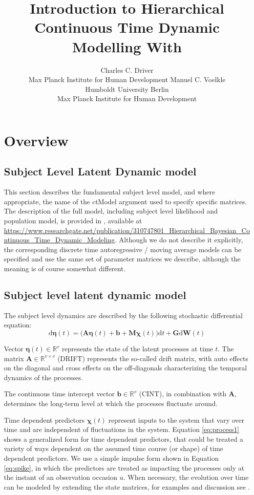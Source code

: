 \documentclass[nojss]{jss}\usepackage[]{graphicx}\usepackage[]{color}
\author{Charles C. Driver \\ Max Planck Institute for Human Development \And 
Manuel C. Voelkle \\ Humboldt University Berlin \\ Max Planck Institute for Human Development}
\title{Introduction to Hierarchical Continuous Time Dynamic Modelling With \pkg{ctsem}}
\newcommand{\vect}[1]{\boldsymbol{\mathbf{#1}}}
\begin{document}
\section{Overview}


\subsection{Subject Level Latent Dynamic model}
This section describes the fundamental subject level model, and where appropriate, the name of the ctModel argument used to specify specific matrices. The description of the full model, including subject level likelihood and population model, is provided in \citet{driver2016hierarchical}, available at \url{https://www.researchgate.net/publication/310747801_Hierarchical_Bayesian_Continuous_Time_Dynamic_Modeling}. Although we do not describe it explicitly, the corresponding discrete time autoregressive / moving average models can be specified and use the same set of parameter matrices we describe, although the meaning is of course somewhat different.

\subsection{Subject level latent dynamic model}
The subject level dynamics are described by the following stochastic differential equation:
\begin{equation}
\label{eq:process1}
\mathrm{d} \vect{\eta} (t) =
\bigg( 
\vect{A \eta} (t) +
\vect{b} +
\vect{M \chi} (t)  
\bigg) \mathrm{d} t +
\vect{G} \mathrm{d} \vect{W}(t)  
\end{equation}

Vector $ \vect{\eta} (t)\in\mathbb{R}^{v}$ represents the state of the latent processes at time $t$. The matrix $ \vect{A} \in \mathbb{R}^{v \times v}$ (DRIFT) represents the so-called drift matrix, with auto effects on the diagonal and cross effects on the off-diagonals characterizing the temporal dynamics of the processes. 

The continuous time intercept vector $ \vect{b} \in\mathbb{R}^{v}$ (CINT), in combination with $\vect{A}$, determines the long-term level at which the processes fluctuate around.

Time dependent predictors $\vect{\chi}(t)$ represent inputs to the system that vary over time and are independent of fluctuations in the system. Equation \ref{eq:process1} shows a generalized form for time dependent predictors, that could be treated a variety of ways dependent on the assumed time course (or shape) of time dependent predictors. We use a simple impulse form shown in Equation \ref{eq:spike}, in which the predictors are treated as impacting the processes only at the instant of an observation occasion $u$. When necessary, the evolution over time can be modeled by extending the state matrices, for examples and discussion see \citet{driver2017understanding}.
\end{document}
